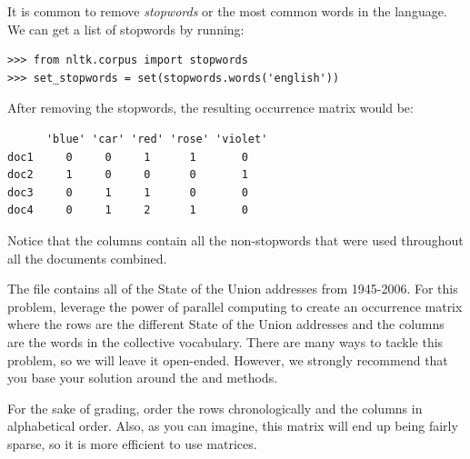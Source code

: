 \begin{problem}
It is common to remove \emph{stopwords} or the most common words in the language. We can get a list of stopwords by running:
\begin{lstlisting}
>>> from nltk.corpus import stopwords
>>> set_stopwords = set(stopwords.words('english'))
\end{lstlisting}

After removing the stopwords, the resulting occurrence matrix would be:
\begin{lstlisting}
      'blue' 'car' 'red' 'rose' 'violet'
doc1     0     0     1      1       0
doc2     1     0     0      0       1
doc3     0     1     1      0       0
doc4     0     1     2      1       0
\end{lstlisting}

Notice that the columns contain all the non-stopwords that were used throughout all the documents combined.

The  file contains all of the State of the Union addresses from 1945-2006. For this problem, leverage the power of parallel computing to create an occurrence matrix where the rows are the different State of the Union addresses and the columns are the words in the collective vocabulary. There are many ways to tackle this problem, so we will leave it open-ended. However, we strongly recommend that you base your solution around the  and  methods.

For the sake of grading, order the rows chronologically and the columns in alphabetical order. Also, as you can imagine, this matrix will end up being fairly sparse, so it is more efficient to use  matrices.
\end{problem}
